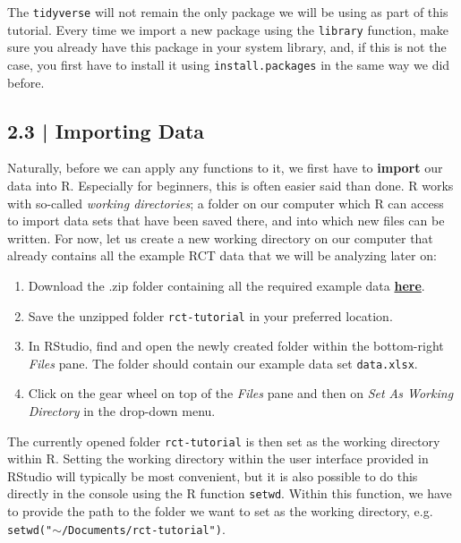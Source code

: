 The \texttt{tidyverse} will not remain the only package we will be using as part of this tutorial. Every time we import a new package using the \texttt{library} function, make sure you already have this package in your system library, and, if this is not the case, you first have to install it using \texttt{install.packages} in the same way we did before.

\subsection{{\normalfont\textsf{\textcolor{sBlue}{\small 2.3 |}}} Importing Data}\label{sssec:import-data}

Naturally, before we can apply any functions to it, we first have to \textbf{import} our data into \textsf{R}. Especially for beginners, this is often easier said than done. \textsf{R} works with so-called \emph{working directories}; a folder on our computer which \textsf{R} can access to import data sets that have been saved there, and into which new files can be written. For now, let us create a new working directory on our computer that already contains all the example RCT data that we will be analyzing later on:

\begin{enumerate}
    \item Download the .zip folder containing all the required example data \href{https://github.com/MathiasHarrer/rct-tutorial/blob/main/rct-tutorial.zip?raw=true}{\textbf{here}}.
    \item Save the unzipped folder \texttt{rct-tutorial} in your preferred location.
    \item In RStudio, find and open the newly created folder within the bottom-right \emph{Files} pane. The folder should contain our example data set \texttt{data.xlsx}.
    \item Click on the gear wheel on top of the \emph{Files} pane and then on \emph{Set As Working Directory} in the drop-down menu.
\end{enumerate}

The currently opened folder \texttt{rct-tutorial} is then set as the working directory within \textsf{R}. Setting the working directory within the user interface provided in RStudio will typically be most convenient, but it is also possible to do this directly in the console using the \textsf{R} function \texttt{setwd}. Within this function, we have to provide the path to the folder we want to set as the working directory, e.g. \texttt{setwd("$\sim$/Documents/rct-tutorial")}.

